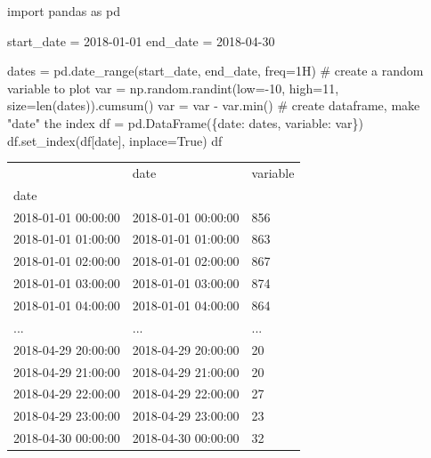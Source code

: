 \documentclass[
  letterpaper,
  DIV=11,
  numbers=noendperiod]{scrreprt}
\newenvironment{Shaded}{\begin{snugshade}}{\end{snugshade}}
\newcommand{\BuiltInTok}[1]{\textcolor[rgb]{0.00,0.23,0.31}{#1}}
\newcommand{\CommentTok}[1]{\textcolor[rgb]{0.37,0.37,0.37}{#1}}
\newcommand{\DecValTok}[1]{\textcolor[rgb]{0.68,0.00,0.00}{#1}}
\newcommand{\ImportTok}[1]{\textcolor[rgb]{0.00,0.46,0.62}{#1}}
\newcommand{\NormalTok}[1]{\textcolor[rgb]{0.00,0.23,0.31}{#1}}
\newcommand{\OperatorTok}[1]{\textcolor[rgb]{0.37,0.37,0.37}{#1}}
\newcommand{\StringTok}[1]{\textcolor[rgb]{0.13,0.47,0.30}{#1}}
\newcommand{\VariableTok}[1]{\textcolor[rgb]{0.07,0.07,0.07}{#1}}
\begin{document}
\begin{Shaded}
\begin{Highlighting}[]
\ImportTok{import}\NormalTok{ pandas }\ImportTok{as}\NormalTok{ pd}

\NormalTok{start\_date }\OperatorTok{=} \StringTok{\textquotesingle{}2018{-}01{-}01\textquotesingle{}}
\NormalTok{end\_date }\OperatorTok{=} \StringTok{\textquotesingle{}2018{-}04{-}30\textquotesingle{}}

\NormalTok{dates }\OperatorTok{=}\NormalTok{ pd.date\_range(start\_date, end\_date, freq}\OperatorTok{=}\StringTok{\textquotesingle{}1H\textquotesingle{}}\NormalTok{)}
\CommentTok{\# create a random variable to plot}
\NormalTok{var }\OperatorTok{=}\NormalTok{ np.random.randint(low}\OperatorTok{={-}}\DecValTok{10}\NormalTok{, high}\OperatorTok{=}\DecValTok{11}\NormalTok{, size}\OperatorTok{=}\BuiltInTok{len}\NormalTok{(dates)).cumsum()}
\NormalTok{var }\OperatorTok{=}\NormalTok{ var }\OperatorTok{{-}}\NormalTok{ var.}\BuiltInTok{min}\NormalTok{()}
\CommentTok{\# create dataframe, make "date" the index}
\NormalTok{df }\OperatorTok{=}\NormalTok{ pd.DataFrame(\{}\StringTok{\textquotesingle{}date\textquotesingle{}}\NormalTok{: dates, }\StringTok{\textquotesingle{}variable\textquotesingle{}}\NormalTok{: var\})}
\NormalTok{df.set\_index(df[}\StringTok{\textquotesingle{}date\textquotesingle{}}\NormalTok{], inplace}\OperatorTok{=}\VariableTok{True}\NormalTok{)}
\NormalTok{df}
\end{Highlighting}
\end{Shaded}

\begin{longtable}[]{@{}lll@{}}
\toprule()
& date & variable \\
date & & \\
\midrule()
\endhead
2018-01-01 00:00:00 & 2018-01-01 00:00:00 & 856 \\
2018-01-01 01:00:00 & 2018-01-01 01:00:00 & 863 \\
2018-01-01 02:00:00 & 2018-01-01 02:00:00 & 867 \\
2018-01-01 03:00:00 & 2018-01-01 03:00:00 & 874 \\
2018-01-01 04:00:00 & 2018-01-01 04:00:00 & 864 \\
... & ... & ... \\
2018-04-29 20:00:00 & 2018-04-29 20:00:00 & 20 \\
2018-04-29 21:00:00 & 2018-04-29 21:00:00 & 20 \\
2018-04-29 22:00:00 & 2018-04-29 22:00:00 & 27 \\
2018-04-29 23:00:00 & 2018-04-29 23:00:00 & 23 \\
2018-04-30 00:00:00 & 2018-04-30 00:00:00 & 32 \\
\bottomrule()
\end{longtable}
\end{document}
